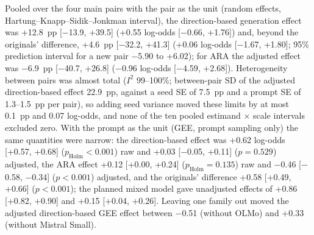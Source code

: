 Pooled over the four main pairs with the pair as the unit (random effects,
Hartung--Knapp--Sidik--Jonkman interval), the direction-based generation
effect was +12.8~pp [$-$13.9, +39.5] (+0.55 log-odds [$-$0.66, +1.76]) and,
beyond the originals' difference, +4.6~pp [$-$32.2, +41.3] (+0.06 log-odds
[$-$1.67, +1.80]; 95\% prediction interval for a new pair $-$5.90 to +6.02);
for ARA the adjusted effect was $-$6.9~pp [$-$40.7, +26.8] ($-$0.96 log-odds
[$-$4.59, +2.68]). Heterogeneity between pairs was almost total ($I^2$
99--100\%; between-pair SD of the adjusted direction-based effect 22.9~pp,
against a seed SE of 7.5~pp and a prompt SE of 1.3--1.5~pp per pair), so
adding seed variance moved these limits by at most 0.1~pp and 0.07 log-odds,
and none of the ten pooled estimand $\times$ scale intervals excluded zero.
With the prompt as the unit (GEE, prompt sampling only) the same quantities
were narrow: the direction-based effect was +0.62 log-odds [+0.57, +0.68]
($p_\mathrm{Holm}<0.001$) raw and +0.03 [$-$0.05, +0.11] ($p=0.529$) adjusted,
the ARA effect +0.12 [+0.00, +0.24] ($p_\mathrm{Holm}=0.135$) raw and $-$0.46
[$-$0.58, $-$0.34] ($p<0.001$) adjusted, and the originals' difference +0.58
[+0.49, +0.66] ($p<0.001$); the planned mixed model gave unadjusted effects of
+0.86 [+0.82, +0.90] and +0.15 [+0.04, +0.26]. Leaving one family out moved
the adjusted direction-based GEE effect between $-$0.51 (without OLMo) and
+0.33 (without Mistral Small).


